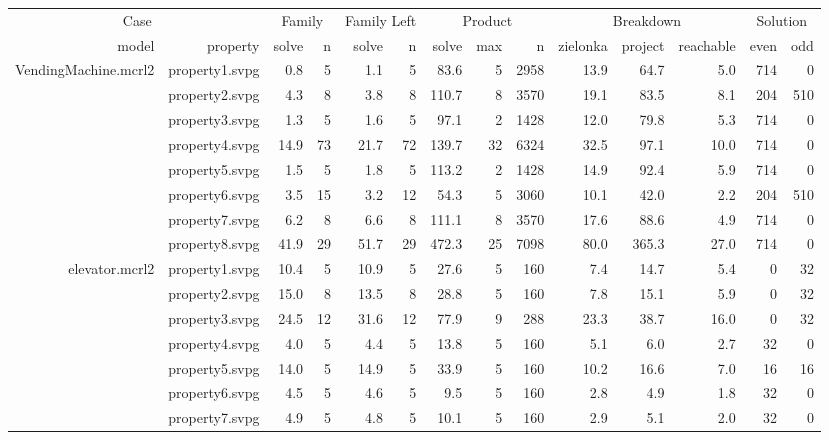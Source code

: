\documentclass{standalone}
\begin{document}
\begin{tabular}{r r|r r|r r|r r r|r r r|r r}
\multicolumn{2}{|c|}{Case} & \multicolumn{2}{c|}{Family} & \multicolumn{2}{c|}{Family Left} & \multicolumn{3}{c|}{Product} & \multicolumn{3}{c|}{Breakdown} & \multicolumn{2}{c}{Solution} \\
model & property & solve & n & solve & n & solve & max & n & zielonka & project & reachable & even & odd \\ \hline
VendingMachine.mcrl2 & property1.svpg                 & 0.8 & 5 & 1.1 & 5 & 83.6 & 5 & 2958 & 13.9 & 64.7 & 5.0 & 714 & 0 \\
 & property2.svpg                 & 4.3 & 8 & 3.8 & 8 & 110.7 & 8 & 3570 & 19.1 & 83.5 & 8.1 & 204 & 510 \\
 & property3.svpg                 & 1.3 & 5 & 1.6 & 5 & 97.1 & 2 & 1428 & 12.0 & 79.8 & 5.3 & 714 & 0 \\
 & property4.svpg                 & 14.9 & 73 & 21.7 & 72 & 139.7 & 32 & 6324 & 32.5 & 97.1 & 10.0 & 714 & 0 \\
 & property5.svpg                 & 1.5 & 5 & 1.8 & 5 & 113.2 & 2 & 1428 & 14.9 & 92.4 & 5.9 & 714 & 0 \\
 & property6.svpg                 & 3.5 & 15 & 3.2 & 12 & 54.3 & 5 & 3060 & 10.1 & 42.0 & 2.2 & 204 & 510 \\
 & property7.svpg                 & 6.2 & 8 & 6.6 & 8 & 111.1 & 8 & 3570 & 17.6 & 88.6 & 4.9 & 714 & 0 \\
 & property8.svpg                 & 41.9 & 29 & 51.7 & 29 & 472.3 & 25 & 7098 & 80.0 & 365.3 & 27.0 & 714 & 0 \\
elevator.mcrl2 & property1.svpg                 & 10.4 & 5 & 10.9 & 5 & 27.6 & 5 & 160 & 7.4 & 14.7 & 5.4 & 0 & 32 \\
 & property2.svpg                 & 15.0 & 8 & 13.5 & 8 & 28.8 & 5 & 160 & 7.8 & 15.1 & 5.9 & 0 & 32 \\
 & property3.svpg                 & 24.5 & 12 & 31.6 & 12 & 77.9 & 9 & 288 & 23.3 & 38.7 & 16.0 & 0 & 32 \\
 & property4.svpg                 & 4.0 & 5 & 4.4 & 5 & 13.8 & 5 & 160 & 5.1 & 6.0 & 2.7 & 32 & 0 \\
 & property5.svpg                 & 14.0 & 5 & 14.9 & 5 & 33.9 & 5 & 160 & 10.2 & 16.6 & 7.0 & 16 & 16 \\
 & property6.svpg                 & 4.5 & 5 & 4.6 & 5 & 9.5 & 5 & 160 & 2.8 & 4.9 & 1.8 & 32 & 0 \\
 & property7.svpg                 & 4.9 & 5 & 4.8 & 5 & 10.1 & 5 & 160 & 2.9 & 5.1 & 2.0 & 32 & 0 \\

\end{tabular}
\end{document}
